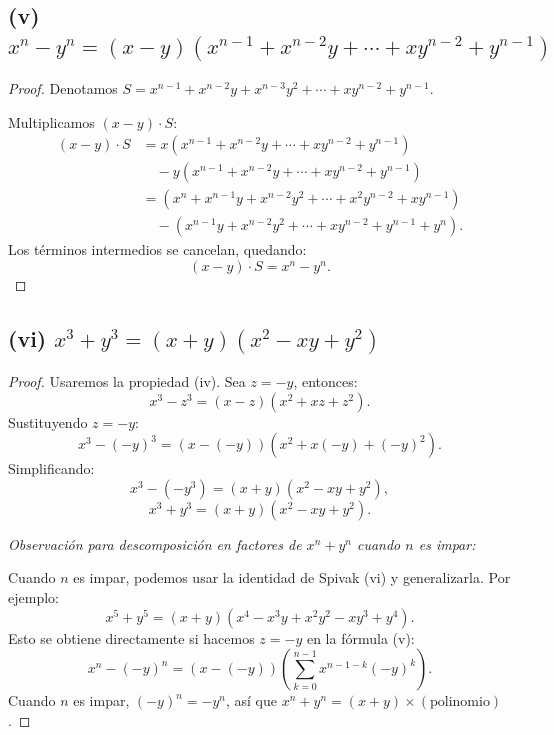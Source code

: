 \subsection*{(v) $x^n - y^n = (x - y)(x^{n-1} + x^{n-2}y + \cdots + xy^{n-2} + y^{n-1})$}

\begin{proof}
Denotamos $S = x^{n-1} + x^{n-2}y + x^{n-3}y^2 + \cdots + xy^{n-2} + y^{n-1}$.

Multiplicamos $(x - y) \cdot S$:
\begin{align*}
(x - y) \cdot S &= x(x^{n-1} + x^{n-2}y + \cdots + xy^{n-2} + y^{n-1})\\
&\quad - y(x^{n-1} + x^{n-2}y + \cdots + xy^{n-2} + y^{n-1})\\
&= (x^n + x^{n-1}y + x^{n-2}y^2 + \cdots + x^2y^{n-2} + xy^{n-1})\\
&\quad - (x^{n-1}y + x^{n-2}y^2 + \cdots + xy^{n-2} + y^{n-1} + y^n).
\end{align*}
Los términos intermedios se cancelan, quedando:
\[
(x - y) \cdot S = x^n - y^n.
\]
\end{proof}

\subsection*{(vi) $x^3 + y^3 = (x + y)(x^2 - xy + y^2)$}

\begin{proof}
Usaremos la propiedad (iv). Sea $z = -y$, entonces:
\[
x^3 - z^3 = (x - z)(x^2 + xz + z^2).
\]
Sustituyendo $z = -y$:
\[
x^3 - (-y)^3 = (x - (-y))(x^2 + x(-y) + (-y)^2).
\]
Simplificando:
\[
x^3 - (-y^3) = (x + y)(x^2 - xy + y^2),
\]
\[
x^3 + y^3 = (x + y)(x^2 - xy + y^2).
\]

\textit{Observación para descomposición en factores de $x^n + y^n$ cuando $n$ es impar:}

Cuando $n$ es impar, podemos usar la identidad de Spivak (vi) y generalizarla. Por ejemplo:
\[
x^5 + y^5 = (x + y)(x^4 - x^3y + x^2y^2 - xy^3 + y^4).
\]
Esto se obtiene directamente si hacemos $z = -y$ en la fórmula (v):
\[
x^n - (-y)^n = (x - (-y))\left(\sum_{k=0}^{n-1} x^{n-1-k}(-y)^k\right).
\]
Cuando $n$ es impar, $(-y)^n = -y^n$, así que $x^n + y^n = (x + y) \times (\text{polinomio})$.
\end{proof}
